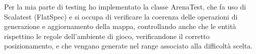 Per la mia parte di testing ho implementato la classe ArenaTest, che fa uso di Scalatest (FlatSpec) e si occupa di verificare la coerenza delle operazioni di generazione e aggiornamento della mappa, controllando anche che le entità rispettino le regole dell'ambiente di gioco, verificandone il corretto posizionamento, e che vengano generate nel range associato alla difficoltà scelta.